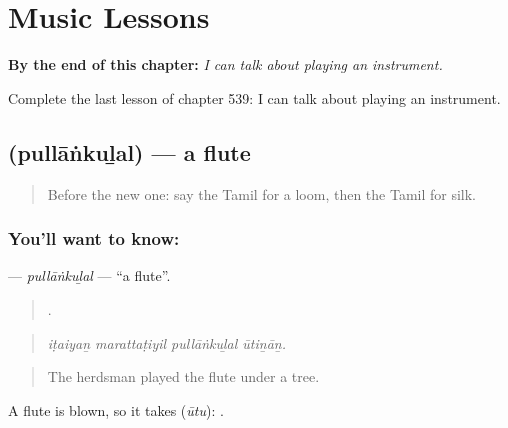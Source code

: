 
\chapter{Music Lessons}
\label{ch:ta-music-lessons}

\begin{chapteropening}
\textbf{By the end of this chapter:} \emph{I can talk about playing an instrument.}

Complete the last lesson of chapter 539: I can talk about playing an instrument.
\end{chapteropening}

\section[\texorpdfstring{\ta{புல்லாங்குழல்} (pullāṅkuḻal)}{புல்லாங்குழல் (pullāṅkuḻal)}]{ (pullāṅkuḻal) — a flute}

\label{lesson:TA-C539-pullankulal}



\begin{quote}
Before the new one: say the Tamil for a loom, then the Tamil for silk.
\end{quote}

\subsection*{You'll want to know: }
\textbf{} — \emph{pullāṅkuḻal} — \textquotedblleft{}a flute\textquotedblright{}.

\begin{quote}
   .
\end{quote}

\begin{quote}
\emph{iṭaiyaṉ marattaṭiyil pullāṅkuḻal ūtiṉāṉ.}
\end{quote}

\begin{quote}
The herdsman played the flute under a tree.
\end{quote}

A flute is blown, so it takes  (\emph{ūtu}):  .

